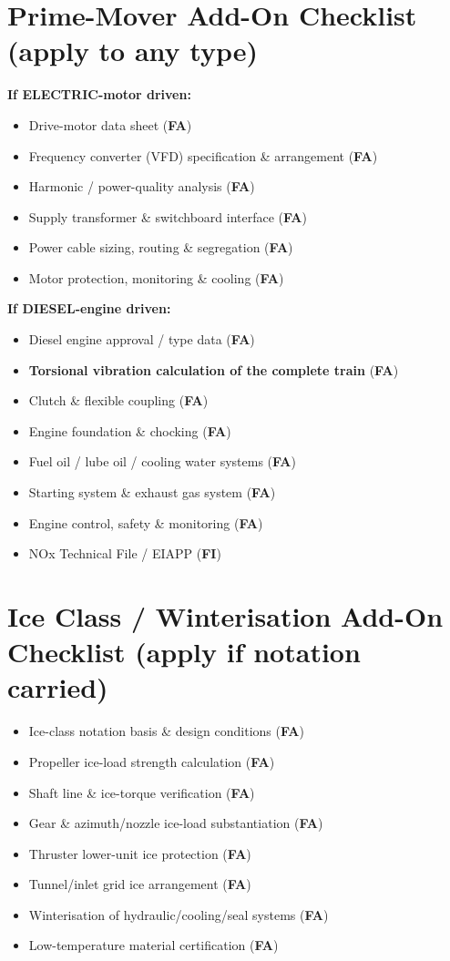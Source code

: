 \documentclass[11pt,a4paper]{report}
\newcommand{\fa}{\textbf{\textcolor{warningred}{FA}}}
\newcommand{\fic}{\textbf{\textcolor{bvgray}{FI}}}
\begin{document}
\section{Prime-Mover Add-On Checklist (apply to any type)}

\textbf{If ELECTRIC-motor driven:}
\begin{itemize}[label=$\square$]
\item Drive-motor data sheet (\fa{})
\item Frequency converter (VFD) specification \& arrangement (\fa{})
\item Harmonic / power-quality analysis (\fa{})
\item Supply transformer \& switchboard interface (\fa{})
\item Power cable sizing, routing \& segregation (\fa{})
\item Motor protection, monitoring \& cooling (\fa{})
\end{itemize}

\textbf{If DIESEL-engine driven:}
\begin{itemize}[label=$\square$]
\item Diesel engine approval / type data (\fa{})
\item \textbf{Torsional vibration calculation of the complete train} (\fa{})
\item Clutch \& flexible coupling (\fa{})
\item Engine foundation \& chocking (\fa{})
\item Fuel oil / lube oil / cooling water systems (\fa{})
\item Starting system \& exhaust gas system (\fa{})
\item Engine control, safety \& monitoring (\fa{})
\item NOx Technical File / EIAPP (\fic{})
\end{itemize}

\section{Ice Class / Winterisation Add-On Checklist (apply if notation carried)}
\begin{itemize}[label=$\square$]
\item Ice-class notation basis \& design conditions (\fa{})
\item Propeller ice-load strength calculation (\fa{})
\item Shaft line \& ice-torque verification (\fa{})
\item Gear \& azimuth/nozzle ice-load substantiation (\fa{})
\item Thruster lower-unit ice protection (\fa{})
\item Tunnel/inlet grid ice arrangement (\fa{})
\item Winterisation of hydraulic/cooling/seal systems (\fa{})
\item Low-temperature material certification (\fa{})
\end{itemize}
\end{document}
